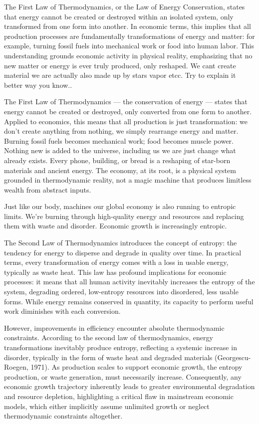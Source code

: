 \documentclass[a4paper,12pt]{article}
\begin{document}
The First Law of Thermodynamics, or the Law of Energy Conservation, states that energy cannot be created or destroyed within an isolated system, only transformed from one form into another. In economic terms, this implies that all production processes are fundamentally transformations of energy and matter: for example, turning fossil fuels into mechanical work or food into human labor. This understanding grounds economic activity in physical reality, emphasizing that no new matter or energy is ever truly produced, only reshaped. We cant create material we are actually also made up by stars vapor etcc. Try to explain it better way you know..

The First Law of Thermodynamics — the conservation of energy — states that energy cannot be created or destroyed, only converted from one form to another. Applied to economics, this means that all production is just transformation: we don’t create anything from nothing, we simply rearrange energy and matter. Burning fossil fuels becomes mechanical work; food becomes muscle power. Nothing new is added to the universe, including us we are just change what already exists. Every phone, building, or bread is a reshaping of star-born materials and ancient energy. The economy, at its root, is a physical system grounded in thermodynamic reality, not a magic machine that produces limitless wealth from abstract inputs.

Just like our body, machines our global economy is also running to entropic limits.  We’re burning through high-quality energy and resources and replacing them with waste and disorder. Economic growth is increasingly entropic.

The Second Law of Thermodynamics introduces the concept of entropy: the tendency for energy to disperse and degrade in quality over time. In practical terms, every transformation of energy comes with a loss in usable energy, typically as waste heat. This law has profound implications for economic processes: it means that all human activity inevitably increases the entropy of the system, degrading ordered, low-entropy resources into disordered, less usable forms. While energy remains conserved in quantity, its capacity to perform useful work diminishes with each conversion.

However, improvements in efficiency encounter absolute thermodynamic constraints. According to the second law of thermodynamics, energy transformations inevitably produce entropy, reflecting a systemic increase in disorder, typically in the form of waste heat and degraded materials (Georgescu-Roegen, 1971). As production scales to support economic growth, the entropy production, or waste generation, must necessarily increase. Consequently, any economic growth trajectory inherently leads to greater environmental degradation and resource depletion, highlighting a critical flaw in mainstream economic models, which either implicitly assume unlimited growth or neglect thermodynamic constraints altogether.
\end{document}
